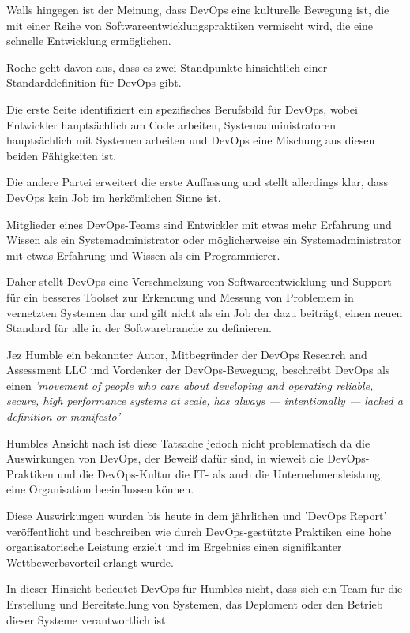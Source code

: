 Walls \cite[S.1]{walls_building_2013} hingegen ist der Meinung, dass DevOps eine kulturelle Bewegung ist, die mit einer Reihe von Softwareentwicklungspraktiken vermischt wird, die eine schnelle Entwicklung ermöglichen. 

Roche \cite{roche_roche_2011} geht davon aus, dass es zwei Standpunkte hinsichtlich einer Standarddefinition für DevOps gibt. 

Die erste Seite identifiziert ein spezifisches Berufsbild für DevOps, wobei Entwickler hauptsächlich am Code arbeiten, Systemadministratoren hauptsächlich mit Systemen arbeiten und DevOps eine Mischung aus diesen beiden Fähigkeiten ist. \cite{muller_whats_2010}

Die andere Partei erweitert die erste Auffassung und stellt allerdings klar, dass DevOps kein Job im herkömlichen Sinne ist. 

Mitglieder eines DevOps-Teams sind Entwickler mit etwas mehr Erfahrung und Wissen als ein Systemadministrator oder möglicherweise ein Systemadministrator mit etwas Erfahrung und Wissen als ein Programmierer. \cite{jones_how_2012}

Daher stellt DevOps eine Verschmelzung von Softwareentwicklung und Support für ein besseres Toolset zur Erkennung und Messung von Problemem in vernetzten Systemen dar und gilt nicht als ein Job der dazu beiträgt, einen neuen Standard für alle in der Softwarebranche zu definieren. \cite{roche_roche_2011} 

Jez Humble ein bekannter Autor, Mitbegründer der DevOps Research and Assessment LLC und Vordenker der DevOps-Bewegung, beschreibt DevOps als einen \textit{'movement of people who care about developing and operating reliable, secure, high performance systems at scale, has always — intentionally — lacked a definition or manifesto'} \cite{humble_state_2014}

Humbles Ansicht nach ist diese Tatsache jedoch nicht problematisch da die Auswirkungen von DevOps, der Beweiß dafür sind, in wieweit die DevOps-Praktiken und die DevOps-Kultur die IT- als auch die Unternehmensleistung, eine Organisation beeinflussen können. \cite{humble_state_2014}

Diese Auswirkungen wurden bis heute in dem jährlichen und 'DevOps Report' \cite{puppet_inc_2020_2021} veröffentlicht und beschreiben wie durch DevOps-gestützte Praktiken eine hohe organisatorische Leistung erzielt und im Ergebniss einen signifikanter Wettbewerbsvorteil erlangt wurde. 

In dieser Hinsicht bedeutet DevOps für Humbles nicht, dass sich ein Team für die Erstellung und Bereitstellung von Systemen, das Deploment oder den Betrieb dieser Systeme verantwortlich ist. \cite{humble_theres_2012}

